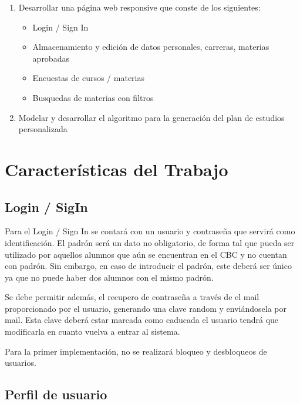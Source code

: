 \documentclass[a4paper]{article}
\begin{document}
\begin{enumerate}
	\item Desarrollar una página web responsive que conste de los siguientes:
		\begin{itemize}
			\item Login / Sign In
			\item Almacenamiento y edición de datos personales, carreras, materias aprobadas
			\item Encuestas de cursos / materias
			\item Busquedas de materias con filtros
		\end{itemize}
		
	\item Modelar y desarrollar el algoritmo para la generación del plan de estudios personalizada
\end{enumerate}

\section{Características del Trabajo}

\subsection{Login / SigIn}

Para el Login / Sign In se contará con un usuario y contraseña que servirá como identificación. El padrón será un dato no obligatorio, de forma tal que pueda ser utilizado por aquellos alumnos que aún se encuentran en el CBC y no cuentan con padrón. Sin embargo, en caso de introducir el padrón, este deberá ser único ya que no puede haber dos alumnos con el mismo padrón.

Se debe permitir además, el recupero de contraseña a través de el mail proporcionado por el usuario, generando una clave random y enviándosela por mail. Esta clave deberá estar marcada como caducada  el usuario tendrá que modificarla en cuanto vuelva a entrar al sistema.

Para la primer implementación, no se realizará bloqueo y desbloqueos de usuarios.

\subsection{Perfil de usuario}
\end{document}
